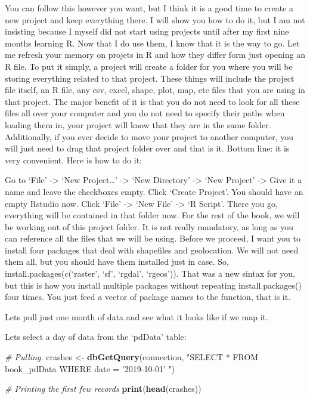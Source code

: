 \documentclass[]{book}
\newenvironment{Shaded}{\begin{snugshade}}{\end{snugshade}}
\newcommand{\CommentTok}[1]{\textcolor[rgb]{0.56,0.35,0.01}{\textit{#1}}}
\newcommand{\KeywordTok}[1]{\textcolor[rgb]{0.13,0.29,0.53}{\textbf{#1}}}
\newcommand{\NormalTok}[1]{#1}
\newcommand{\StringTok}[1]{\textcolor[rgb]{0.31,0.60,0.02}{#1}}
\begin{document}
You can follow this however you want, but I think it is a good time to create a new project and keep everything there. I will show you how to do it, but I am not insisting because I myself did not start using projects until after my first nine months learning R. Now that I do use them, I know that it is the way to go. Let me refresh your memory on projets in R and how they differ form just opening an R file. To put it simply, a project will create a folder for you where you will be storing everything related to that project. These things will include the project file itself, an R file, any csv, excel, shape, plot, map, etc files that you are using in that project. The major benefit of it is that you do not need to look for all these files all over your computer and you do not need to specify their paths when loading them in, your project will know that they are in the same folder. Additionally, if you ever decide to move your project to another computer, you will just need to drag that project folder over and that is it. Bottom line: it is very convenient. Here is how to do it:

Go to `File' -\textgreater{} `New Project\ldots{}' -\textgreater{} `New Directory' -\textgreater{} `New Project' -\textgreater{} Give it a name and leave the checkboxes empty. Click `Create Project'. You should have an empty Rstudio now. Click `File' -\textgreater{} `New File' -\textgreater{} `R Script'. There you go, everything will be contained in that folder now. For the rest of the book, we will be working out of this project folder. It is not really mandatory, as long as you can reference all the files that we will be using. Before we proceed, I want you to install four packages that deal with shapefiles and geolocation. We will not need them all, but you should have them installed just in case. So, install.packages(c(`raster', `sf', `rgdal', `rgeos')). That was a new sintax for you, but this is how you install multiple packages without repeating install.packages() four times. You just feed a vector of package names to the function, that is it.

Lets pull just one month of data and see what it looks like if we map it.

Lets select a day of data from the `pdData' table:

\begin{Shaded}
\begin{Highlighting}[]
\CommentTok{# Pulling.}
\NormalTok{  crashes <-}\StringTok{ }\KeywordTok{dbGetQuery}\NormalTok{(connection, }
  \StringTok{"SELECT * }
\StringTok{  FROM book_pdData }
\StringTok{  WHERE date = '2019-10-01'}
\StringTok{  "}\NormalTok{)}

\CommentTok{# Printing the first few records}
  \KeywordTok{print}\NormalTok{(}\KeywordTok{head}\NormalTok{(crashes))}
\end{Highlighting}
\end{Shaded}
\end{document}
